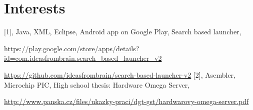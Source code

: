 \documentclass[11pt,a4paper,sans]{moderncv} %
\begin{document}

\section{Interests}




\begin{thebibliography}{99}



         [1], Java, XML, Eclipse, Android app on Google Play, Search based launcher, \par
                 \url{https://play.google.com/store/apps/details?id=com.ideasfrombrain.search_based_launcher_v2}\par
		 \url{https://github.com/ideasfrombrain/search-based-launcher-v2}
         [2], Asembler, Microchip PIC, High school thesis: Hardware Omega Server, \par
                \url{http://www.panska.cz/files/ukazky-praci/dgt-gst/hardwarovy-omega-server.pdf}

\end{thebibliography}
\end{document}
